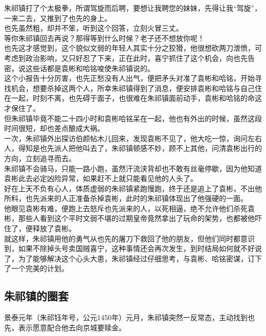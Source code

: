 \begin{multicols}{\theparacolNo}
朱祁镇打了个太极拳，所谓驾旋而后聘，要想让我聘您的妹妹，先得让我“驾旋”，一来二去，又推到了也先的身上。\\

也先虽然粗，却并不笨，听到这个回答，立刻火冒三丈。\\

等你朱祁镇回去再说？那得等到什么时候？老子还不想放你呢！\\

也先这才感觉到，这个貌似文弱的年轻人其实十分之狡猾，他很想砍两刀泄愤，可考虑到政治影响，又只好忍了下来，正在此时，喜宁抓住了这个机会，向也先告密，说这些话都是袁彬和哈铭唆使朱祁镇说的。\\

这个小报告十分厉害，也先正愁没有人出气，便把矛头对准了袁彬和哈铭，开始寻找机会，想要杀掉这两个人，所幸朱祁镇得到了消息，便安排袁彬和哈铭与自己住在一起，时刻不离，也先碍于面子，也很难在朱祁镇面前动手，袁彬和哈铭的命这才保住了。\\

但朱祁镇毕竟不能二十四小时和袁彬哈铭呆在一起，他也有外出的时候，虽然这段时间很短，却也差点酿成大祸。\\

一次，朱祁镇外出探访伯颜帖木儿回来，发现袁彬不见了，他大吃一惊，询问左右人，得知是也先派人把他叫去了，朱祁镇顿感不妙，顾不上其他，问清袁彬出行的方向，立刻追寻而去。\\

朱祁镇不会骑马，只能一路小跑，虽然汗流浃背却也不敢有丝毫停歇，因为他知道袁彬此去必定凶险异常，如果赶不上就只能看见他的人头了。\\

好在上天不负有心人，体质虚弱的朱祁镇紧跑慢跑，终于还是追上了袁彬，不出他所料，也先派来的人正准备杀掉袁彬，此时的朱祁镇体现出了他强硬的一面。\\

他眼见袁彬有难，便跑上去怒斥也先派来的人，以死相逼，绝不允许他们杀死袁彬，那些人看到这个平时文弱不堪的过期皇帝竟然拿出了玩命的架势，也都被他吓住了，便释放了袁彬。\\

就这样，朱祁镇用他的勇气从也先的屠刀下救回了他的朋友，但他们同时都意识到，如果不除掉头号卖国贼喜宁，这种事情还会再次发生，到时结局如何就不好说了，为了能够解决这个心头大患，朱祁镇经过仔细思考，与袁彬、哈铭密谋，订下了一个完美的计划。\\

\subsection{朱祁镇的圈套}
景泰元年（朱祁钰年号，公元1450年）元月，朱祁镇突然一反常态，主动找到也先，表示愿意配合他去向京城要赎金。\\


\end{multicols}
